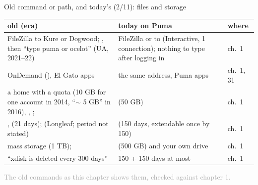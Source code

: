 \documentclass[aspectratio=169,11pt]{beamer}
\newcommand{\sourcecredit}[1]{\vfill\begin{flushright}\tiny\textcolor{DarkGray}{#1}\end{flushright}}
\begin{document}
\begin{frame}{Old command or path, and today's (2/11): files and storage}
\label{fr:map1b}
\scriptsize
\renewcommand{\arraystretch}{1.1}
\setlength{\tabcolsep}{3pt}
\begin{tabular}{@{}L{0.43\textwidth}L{0.42\textwidth}L{0.1\textwidth}@{}}
\toprule
old (era) & today on Puma & where \\
\midrule
FileZilla to Kure or Dogwood; , then ``type puma or ocelot'' (UA, 2021--22) & FileZilla or  to  (Interactive, 1 connection); nothing to type after logging in & ch.\ 1 \\
OnDemand (), El Gato apps & the same address, Puma apps & ch.\ 1, 31 \\
a home with a quota (10 GB for one account in 2014, ``$\sim$ 5 GB'' in 2016), , ;  &  (50 GB) & ch.\ 1 \\
,  (21 days);  (Longleaf; period not stated) &  (150 days, extendable once by 150) & ch.\ 1 \\
mass storage  (1 TB);  &  (500 GB) and your own drive & ch.\ 1 \\
``xdisk is deleted every 300 days'' & 150 + 150 days at most & ch.\ 1 \\
\bottomrule
\end{tabular}
\sourcecredit{The old commands as this chapter shows them, checked against chapter 1.}
\end{frame}
\end{document}
